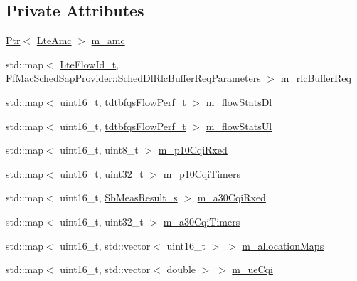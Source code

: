\subsection*{Private Attributes}
\begin{DoxyCompactItemize}
\item 
\hyperlink{classns3_1_1Ptr}{Ptr}$<$ \hyperlink{classns3_1_1LteAmc}{Lte\+Amc} $>$ \hyperlink{classns3_1_1TdTbfqFfMacScheduler_a42e469f5ce9e3e079123f5c9a60fe7c4}{m\+\_\+amc}
\item 
std\+::map$<$ \hyperlink{structns3_1_1LteFlowId__t}{Lte\+Flow\+Id\+\_\+t}, \hyperlink{structns3_1_1FfMacSchedSapProvider_1_1SchedDlRlcBufferReqParameters}{Ff\+Mac\+Sched\+Sap\+Provider\+::\+Sched\+Dl\+Rlc\+Buffer\+Req\+Parameters} $>$ \hyperlink{classns3_1_1TdTbfqFfMacScheduler_af1c1db8b8201f905faf17ce03f0369db}{m\+\_\+rlc\+Buffer\+Req}
\item 
std\+::map$<$ uint16\+\_\+t, \hyperlink{structns3_1_1tdtbfqsFlowPerf__t}{tdtbfqs\+Flow\+Perf\+\_\+t} $>$ \hyperlink{classns3_1_1TdTbfqFfMacScheduler_a077474dfdd0b794b6e274954e049e0c4}{m\+\_\+flow\+Stats\+Dl}
\item 
std\+::map$<$ uint16\+\_\+t, \hyperlink{structns3_1_1tdtbfqsFlowPerf__t}{tdtbfqs\+Flow\+Perf\+\_\+t} $>$ \hyperlink{classns3_1_1TdTbfqFfMacScheduler_ad4ebe2d2a182a088507ade045b583903}{m\+\_\+flow\+Stats\+Ul}
\item 
std\+::map$<$ uint16\+\_\+t, uint8\+\_\+t $>$ \hyperlink{classns3_1_1TdTbfqFfMacScheduler_afadf1919ebd3f749f973a94088ff74dc}{m\+\_\+p10\+Cqi\+Rxed}
\item 
std\+::map$<$ uint16\+\_\+t, uint32\+\_\+t $>$ \hyperlink{classns3_1_1TdTbfqFfMacScheduler_aaf5d854702133742423180538d27f6f1}{m\+\_\+p10\+Cqi\+Timers}
\item 
std\+::map$<$ uint16\+\_\+t, \hyperlink{structns3_1_1SbMeasResult__s}{Sb\+Meas\+Result\+\_\+s} $>$ \hyperlink{classns3_1_1TdTbfqFfMacScheduler_a6523ed7737d8e753380a1207becdae8a}{m\+\_\+a30\+Cqi\+Rxed}
\item 
std\+::map$<$ uint16\+\_\+t, uint32\+\_\+t $>$ \hyperlink{classns3_1_1TdTbfqFfMacScheduler_a208160933cb6d934c6cfb8114734226a}{m\+\_\+a30\+Cqi\+Timers}
\item 
std\+::map$<$ uint16\+\_\+t, std\+::vector$<$ uint16\+\_\+t $>$ $>$ \hyperlink{classns3_1_1TdTbfqFfMacScheduler_a0801127489d3eda5a462660c4af4c8bd}{m\+\_\+allocation\+Maps}
\item 
std\+::map$<$ uint16\+\_\+t, std\+::vector$<$ double $>$ $>$ \hyperlink{classns3_1_1TdTbfqFfMacScheduler_a5cf85878fa75fd31bdc63527492e9270}{m\+\_\+ue\+Cqi}

\end{DoxyCompactItemize}
